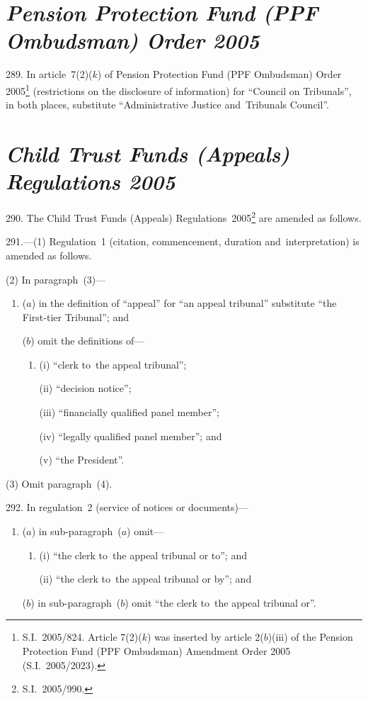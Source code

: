 \documentclass[12pt,a4paper]{article}
\begin{document}
\section*{\itshape Pension Protection Fund (PPF Ombudsman) Order 2005}

289.  In article~7(2)($k$)  of Pension Protection Fund (PPF Ombudsman) Order 2005\footnote{S.I.~2005/824. Article 7(2)($k$) was inserted by article 2($b$)(iii) of the Pension Protection Fund (PPF Ombudsman) Amendment Order 2005 (S.I.~2005/2023).} (restrictions on the disclosure of information) for “Council on Tribunals”, in both places, substitute “Administrative Justice and~Tribunals Council”.

\section*{\itshape\sloppy{} Child Trust Funds (Appeals) Regulations 2005}

290.  The Child Trust Funds (Appeals) Regulations~2005\footnote{S.I.~2005/990.} are amended as follows.

\medskip

291.---(1)  Regulation~1 (citation, commencement, duration and~interpretation) is amended as follows.

(2) In paragraph~(3)—
\begin{enumerate}\item[]
($a$) in the definition of “appeal” for “an appeal tribunal” substitute “the First-tier Tribunal”; and

($b$) omit the definitions of—
\begin{enumerate}\item[]
(i) “clerk to~the appeal tribunal”;

(ii) “decision notice”;

(iii) “financially qualified panel member”;

(iv) “legally qualified panel member”; and

(v) “the President”.
\end{enumerate}
\end{enumerate}

(3) Omit paragraph~(4).

\medskip

292.  In regulation~2 (service of notices or documents)—
\begin{enumerate}\item[]
($a$) in sub-paragraph~($a$)  omit—
\begin{enumerate}\item[]
(i) “the clerk to~the appeal tribunal or to”; and

(ii) “the clerk to~the appeal tribunal or by”; and
\end{enumerate}

($b$) in sub-paragraph~($b$)  omit “the clerk to~the appeal tribunal or”.
\end{enumerate}
\end{document}
